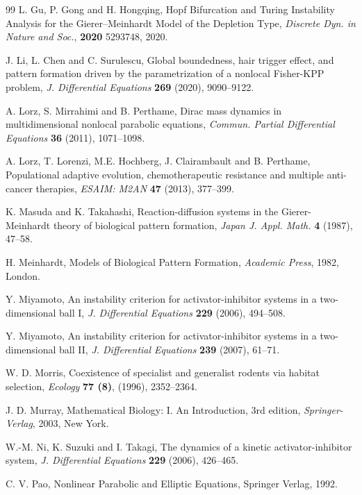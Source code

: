 \documentclass[leqno,12pt]{article}
\numberwithin{equation}{section}
\begin{document}
\begin{thebibliography}{99}
  L. Gu, P. Gong and H. Hongqing,  Hopf Bifurcation and Turing Instability Analysis for the Gierer–Meinhardt Model of the Depletion Type, {\it Discrete Dyn. in Nature and Soc.}, {\bf 2020} 5293748, 2020.

 J. Li, L. Chen and C. Surulescu, Global boundedness, hair trigger effect, and pattern formation driven by the parametrization of a nonlocal Fisher-KPP problem,
{\it J. Differential Equations} {\bf  269} (2020), 9090--9122.

 A. Lorz, S. Mirrahimi and B. Perthame, Dirac mass dynamics in multidimensional nonlocal parabolic equations,
{\it Commun. Partial Differential Equations} {\bf 36} (2011), 1071--1098.

 A. Lorz, T. Lorenzi, M.E. Hochberg, J. Clairambault and B. Perthame, Populational adaptive evolution, chemotherapeutic resistance and multiple anti-cancer therapies,
{\it ESAIM: M2AN} {\bf 47} (2013), 377--399.

  K. Masuda and K. Takahashi, Reaction-diffusion systems in the Gierer-Meinhardt
theory of biological pattern formation,
{\it  Japan J. Appl. Math.} {\bf 4} (1987), 47--58.

 H. Meinhardt, Models of Biological Pattern Formation, {\it Academic Press}, 1982, London.
  

 Y. Miyamoto,  An instability criterion for activator-inhibitor systems in a two-dimensional ball I,
{\it J. Differential Equations} {\bf 229} (2006),  494--508.

 Y. Miyamoto, An instability criterion for activator-inhibitor systems in a two-dimensional ball II,
{\it  J. Differential Equations} {\bf 239} (2007), 61--71.

W. D. Morris, Coexistence of specialist and generalist rodents via habitat selection,
{\it Ecology} {\bf 77 (8)}, (1996), 2352--2364.

J. D. Murray, Mathematical Biology: I. An Introduction, 3rd edition, {\it Springer-Verlag}, 2003, New York.
  

 W.-M. Ni, K. Suzuki and I. Takagi, The dynamics of a kinetic activator-inhibitor system,
{\it J. Differential Equations} {\bf 229} (2006), 426--465.




 C. V. Pao,  Nonlinear Parabolic and Elliptic Equations, Springer Verlag, 1992. 


\end{thebibliography}
\end{document}
